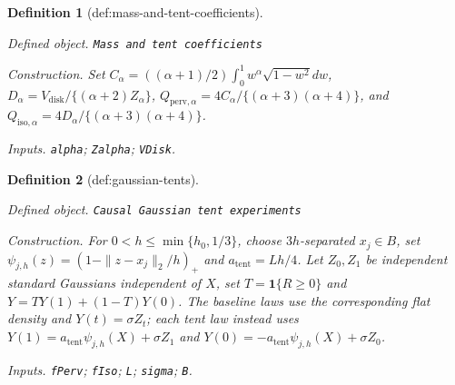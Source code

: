 \documentclass{article}
\newtheorem{definition}{Definition}
\begin{document}
\begin{definition}[def:mass-and-tent-coefficients]\label{def:mass-and-tent-coefficients}
\par\smallskip\noindent\emph{Defined object.} \texttt{Mass and tent coefficients}
\par\smallskip\noindent\emph{Construction.} Set \(C_\alpha=((\alpha+1)/2)\int_0^1w^\alpha\sqrt{1-w^2}dw\), \(D_\alpha=V_{\mathrm{disk}}/\{(\alpha+2)Z_\alpha\}\), \(Q_{\mathrm{perv},\alpha}=4C_\alpha/\{(\alpha+3)(\alpha+4)\}\), and \(Q_{\mathrm{iso},\alpha}=4D_\alpha/\{(\alpha+3)(\alpha+4)\}\).
\par\smallskip\noindent\emph{Inputs.} \texttt{alpha}; \texttt{Zalpha}; \texttt{VDisk}.
\end{definition}

\begin{definition}[def:gaussian-tents]\label{def:gaussian-tents}
\par\smallskip\noindent\emph{Defined object.} \texttt{Causal Gaussian tent experiments}
\par\smallskip\noindent\emph{Construction.} For \(0<h\leq\min\{h_0,1/3\}\), choose \(3h\)-separated \(x_j\in B\), set \(\psi_{j,h}(z)=(1-\|z-x_j\|_2/h)_+\) and \(a_{\mathrm{tent}}=Lh/4\). Let \(Z_0,Z_1\) be independent standard Gaussians independent of \(X\), set \(T=\mathbf1\{R\geq0\}\) and \(Y=TY(1)+(1-T)Y(0)\). The baseline laws use the corresponding flat density and \(Y(t)=\sigma Z_t\); each tent law instead uses \(Y(1)=a_{\mathrm{tent}}\psi_{j,h}(X)+\sigma Z_1\) and \(Y(0)=-a_{\mathrm{tent}}\psi_{j,h}(X)+\sigma Z_0\).
\par\smallskip\noindent\emph{Inputs.} \texttt{fPerv}; \texttt{fIso}; \texttt{L}; \texttt{sigma}; \texttt{B}.
\end{definition}
\end{document}
